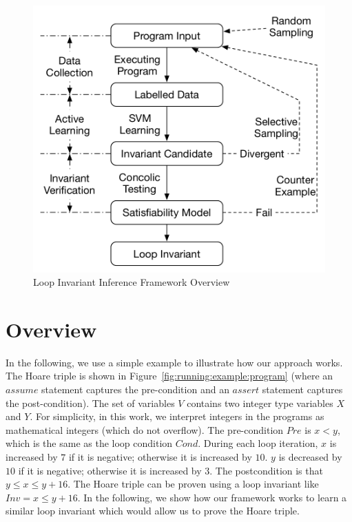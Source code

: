 \begin{figure}[t]
    \centering
    \includegraphics[scale=0.45]{figures/overview.pdf}
    \caption{Loop Invariant Inference Framework Overview}
    \label{fig:overview}
\end{figure}

\section{Overview} \label{sec:overview}
In the following, we use a simple example to illustrate how our approach works. The Hoare triple is shown in Figure~\ref{fig:running:example:program} (where an $assume$ statement captures the pre-condition and an $assert$ statement captures the post-condition). The set of variables $V$ contains two integer type variables $X$ and $Y$. For simplicity, in this work, we interpret integers in the programs as mathematical integers (which do not overflow). The pre-condition $\mathit{Pre}$ is $x < y$, which is the same as the loop condition $\mathit{Cond}$.
During each loop iteration, $x$ is increased by $7$ if it is negative; otherwise it is increased by $10$. $y$ is decreased by $10$ if it is negative; otherwise it is increased by $3$. The postcondition is that $y \le x \le y + 16$.
The Hoare triple can be proven using a loop invariant like $\mathit{Inv} = x \le y + 16$. In the following, we show how our framework works to learn a similar loop invariant which would allow us to prove the Hoare triple.

